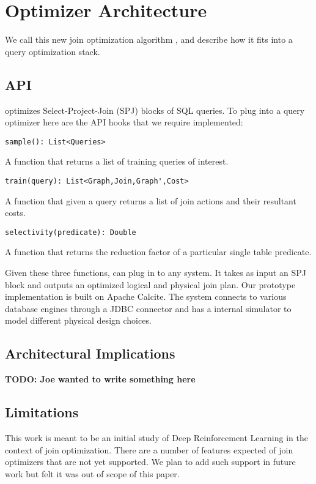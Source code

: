 \section{Optimizer Architecture}
We call this new join optimization algorithm \sys, and describe how it fits into a query optimization stack. 

\subsection{API}
\sys optimizes Select-Project-Join (SPJ) blocks of SQL queries. To plug \sys into a query optimizer here are the API hooks that we require implemented:

\vspace{0.5em}
\begin{lstlisting}
sample(): List<Queries> 
\end{lstlisting}
\noindent A function that returns a list of training queries of interest.

\vspace{0.5em}
\begin{lstlisting}
train(query): List<Graph,Join,Graph',Cost> 
\end{lstlisting}
\noindent A function that given a query returns a list of join actions and their resultant costs. 

\vspace{0.5em}
\begin{lstlisting}
selectivity(predicate): Double
\end{lstlisting}
\noindent A function that returns the reduction factor of a particular single table predicate.

\vspace{0.5em}
Given these three functions, \sys can plug in to any system. It takes as input an SPJ block and outputs an optimized logical and physical join plan. 
Our prototype implementation is built on Apache Calcite.
The system connects to various database engines through a JDBC connector and has a internal simulator to model different physical design choices.

\subsection{Architectural Implications}
\textbf{TODO: Joe wanted to write something here}


\subsection{Limitations}
This work is meant to be an initial study of Deep Reinforcement Learning in the context of join optimization. There are a number of features expected of join optimizers that are not yet supported. We plan to add such support in future work but felt it was out of scope of this paper.

